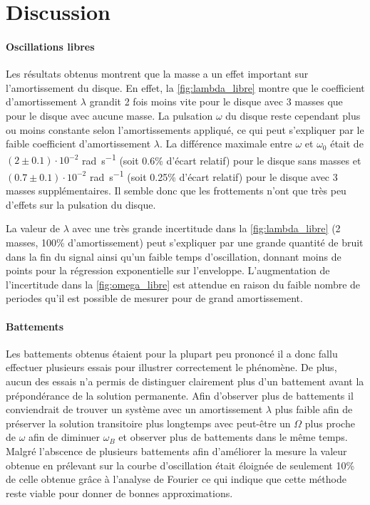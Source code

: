 \section{Discussion}

\paragraph{Oscillations libres}
Les résultats obtenus montrent que la masse a un effet important sur l'amortissement du disque. En effet, la \autoref{fig:lambda_libre} montre que le coefficient d'amortissement \(\lambda\) grandit 2 fois moins vite pour le disque avec 3 masses que pour le disque avec aucune masse. La pulsation \(\omega\) du disque reste cependant plus ou moins constante selon l'amortissements appliqué, ce qui peut s'expliquer par le faible coefficient d'amortissement \(\lambda\). La différence maximale entre \(\omega\) et \(\omega_0\) était de \((2 \pm 0.1) \cdot 10^{-2}\) \si{\radian\per\second} (soit 0.6\% d'écart relatif) pour le disque sans masses et \((0.7 \pm 0.1) \cdot 10^{-2}\) \si{\radian\per\second} (soit 0.25\% d'écart relatif) pour le disque avec 3 masses supplémentaires. Il semble donc que les frottements n'ont que très peu d'effets sur la pulsation du disque.

La valeur de \(\lambda\) avec une très grande incertitude dans la \autoref{fig:lambda_libre} (2 masses, 100\% d'amortissement) peut s'expliquer par une grande quantité de bruit dans la fin du signal ainsi qu'un faible temps d'oscillation, donnant moins de points pour la régression exponentielle sur l'enveloppe. L'augmentation de l'incertitude dans la \autoref{fig:omega_libre} est attendue en raison du faible nombre de periodes qu'il est possible de mesurer pour de grand amortissement.


\paragraph{Battements}
Les battements obtenus étaient pour la plupart peu prononcé il a donc fallu effectuer plusieurs essais pour illustrer correctement le phénomène. De plus, aucun des essais n'a permis de distinguer clairement plus d'un battement avant la prépondérance de la solution permanente. Afin d'observer plus de battements il conviendrait de trouver un système avec un amortissement $\lambda$ plus faible afin de préserver la solution transitoire plus longtemps avec peut-être un $\Omega$ plus proche de $\omega$ afin de diminuer $\omega_B$ et observer plus de battements dans le même temps. Malgré l'abscence de plusieurs battements afin d'améliorer la mesure la valeur obtenue en prélevant sur la courbe d'oscillation était éloignée de seulement 10\% de celle obtenue grâce à l'analyse de Fourier ce qui indique que cette méthode reste viable pour donner de bonnes approximations.

